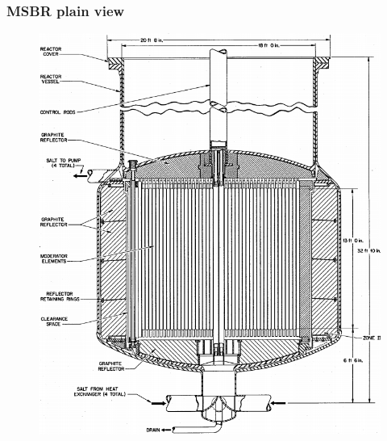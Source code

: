 \documentclass[9pt,handout]{beamer}
\begin{document}
\begin{frame}
  \frametitle{\gls{MSBR} plain view}
               \begin{figure}[t]
                \vspace*{-0.1in}
                \includegraphics[height=0.75\textwidth]{./images/msbr_plain.png}
               \end{figure}
              
\end{frame}
\end{document}

